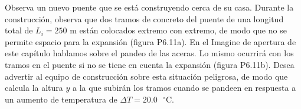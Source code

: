 \item Observa un nuevo puente que se está construyendo cerca de su casa. Durante la construcción, observa que dos tramos de concreto del puente de una longitud total de $L_i = 250\text{ m}$ están colocados extremo con extremo, de modo que no se permite espacio para la expansión (figura P6.11a). En el Imagine de apertura de este capítulo hablamos sobre el pandeo de las aceras. Lo mismo ocurrirá con los tramos en el puente si no se tiene en cuenta la expansión (figura P6.11b). Desea advertir al equipo de construcción sobre esta situación peligrosa, de modo que calcula la altura $y$ a la que subirán los tramos cuando se pandeen en respuesta a un aumento de temperatura de $\Delta T = 20.0\text{ }^\circ\text{C}$.
